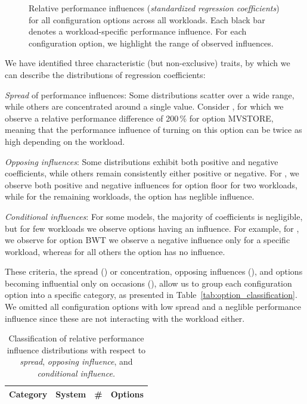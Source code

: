 {\begin{figure}
	\caption{Relative performance influences (\textit{standardized regression coefficients}) for all configuration options across all workloads. Each black bar denotes a workload-specific performance influence. For each configuration option, we highlight the range of observed influences. }
	\label{fig:results_influence}
\end{figure}
{\color{orange!0!black}
We have identified three characteristic (but non-exclusive) traits, by which we can describe the distributions of regression coefficients: 
\begin{compactitem}	
\item[\circled{1}] \emph{Spread} of performance influences: Some distributions scatter over a wide range, while others are concentrated around a single value. Consider \htwo, for which we observe a relative performance difference of 200\,\% for option \textsf{MVSTORE}, meaning that the performance influence of turning on this option can be twice as high depending on the workload. 

\item[\circled{2}] \emph{Opposing influences}: Some distributions exhibit both positive and negative coefficients, while others remain consistently either positive or negative. For \dconvert, we observe both positive and negative influences for option \textsf{floor} for two workloads, while for the remaining workloads, the option has neglible influence.

\item[\circled{3}] \emph{Conditional influences}: For some models, the majority of coefficients is negligible, but for few workloads we observe options having an influence. For example, for \kanzi, we observe for option \textsf{BWT} we observe a negative influence only for a specific workload, whereas for all others the option has no influence.
\end{compactitem}
	
These criteria, the spread () or concentration, opposing influences (), and options becoming influential only on occasions (), allow us to group each configuration option into a specific category, as presented in Table~\ref{tab:option_classification}. We omitted all configuration options with low spread and a neglible performance influence since these are not interacting with the workload either. 
}
\begin{table}[ht!]
	\centering
	\footnotesize
	\caption{Classification of relative performance influence distributions with respect to \textit{spread}, \textit{opposing influence}, and \textit{conditional influence.}}
	\begin{tabular}{p{1.2cm}p{0.7cm}rp{4.9cm}} %
		\toprule
		\textbf{Category} & \textbf{System} & \textbf{\#} & \textbf{Options} \\
		\midrule
		

\end{tabular}
\end{table}}
